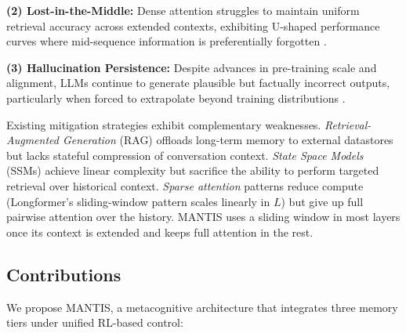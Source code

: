 \documentclass{article}
\begin{document}
\textbf{(2) Lost-in-the-Middle:} Dense attention struggles to maintain uniform retrieval accuracy across extended contexts, exhibiting U-shaped performance curves where mid-sequence information is preferentially forgotten \cite{liu2023lost}.

\textbf{(3) Hallucination Persistence:} Despite advances in pre-training scale and alignment, LLMs continue to generate plausible but factually incorrect outputs, particularly when forced to extrapolate beyond training distributions \cite{zhang2023sirens,ji2023hallucination}.

Existing mitigation strategies exhibit complementary weaknesses. \textit{Retrieval-Augmented Generation} (RAG) \cite{lewis2020retrieval} offloads long-term memory to external datastores but lacks stateful compression of conversation context. \textit{State Space Models} (SSMs) \cite{gu2022s4,gu2023mamba} achieve linear complexity but sacrifice the ability to perform targeted retrieval over historical context. \textit{Sparse attention} patterns \cite{child2019sparse,beltagy2020longformer} reduce compute (Longformer's sliding-window pattern scales linearly in $L$) but give up full pairwise attention over the history. MANTIS uses a sliding window in most layers once its context is extended and keeps full attention in the rest.

\subsection{Contributions}

We propose MANTIS, a metacognitive architecture that integrates three memory tiers under unified RL-based control:
\end{document}
